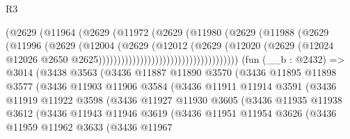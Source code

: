 \begin{lexlean}{R3}
\begin{coremodule}
                                          (@2629
                                            (@11964
                                              (@2629
                                                (@11972
                                                  (@2629
                                                    (@11980
                                                      (@2629
                                                        (@11988
                                                          (@2629
                                                            (@11996
                                                              (@2629
                                                                (@12004
                                                                  (@2629
                                                                    (@12012
                                                                      (@2629
                                                                        (@12020
                                                                          (@2629
                                                                            (@12024
                                                                              @12026
                                                                              @2650
                                                                              @2625)))))))))))))))))))))))))))))))))))))
    (fun (__b : @2432) =>
    @3014
      (@3438
        @3563
        (@3436
          @11887
          @11890
          @3570
          (@3436
            @11895
            @11898
            @3577
            (@3436
              @11903
              @11906
              @3584
              (@3436
                @11911
                @11914
                @3591
                (@3436
                  @11919
                  @11922
                  @3598
                  (@3436
                    @11927
                    @11930
                    @3605
                    (@3436
                      @11935
                      @11938
                      @3612
                      (@3436
                        @11943
                        @11946
                        @3619
                        (@3436
                          @11951
                          @11954
                          @3626
                          (@3436
                            @11959
                            @11962
                            @3633
                            (@3436
                              @11967

\end{coremodule}
\end{lexlean}
